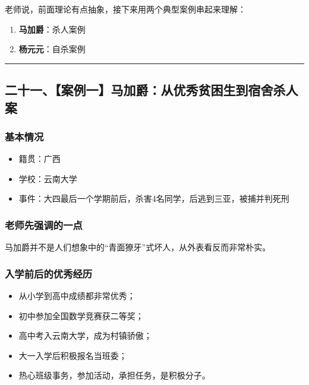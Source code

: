 \documentclass[
  chinese,
  9pt,
  a4paper,
]{ctexart}
\providecommand{\tightlist}{%
  \setlength{\itemsep}{0pt}\setlength{\parskip}{0pt}}
\begin{document}
老师说，前面理论有点抽象，接下来用两个典型案例串起来理解：

\begin{enumerate}
\def\labelenumi{\arabic{enumi}.}
\tightlist
\item
  \textbf{马加爵}：杀人案例
\item
  \textbf{杨元元}：自杀案例
\end{enumerate}

\begin{center}\rule{0.5\linewidth}{0.5pt}\end{center}

\subsection{二十一、【案例一】马加爵：从优秀贫困生到宿舍杀人案}\label{ux4e8cux5341ux4e00ux6848ux4f8bux4e00ux9a6cux52a0ux7235ux4eceux4f18ux79c0ux8d2bux56f0ux751fux5230ux5bbfux820dux6740ux4ebaux6848}

\subsubsection{基本情况}\label{ux57faux672cux60c5ux51b5}

\begin{itemize}
\tightlist
\item
  籍贯：广西
\item
  学校：云南大学
\item
  事件：大四最后一个学期前后，杀害4名同学，后逃到三亚，被捕并判死刑
\end{itemize}

\subsubsection{老师先强调的一点}\label{ux8001ux5e08ux5148ux5f3aux8c03ux7684ux4e00ux70b9}

马加爵并不是人们想象中的``青面獠牙''式坏人，从外表看反而非常朴实。

\subsubsection{入学前后的优秀经历}\label{ux5165ux5b66ux524dux540eux7684ux4f18ux79c0ux7ecfux5386}

\begin{itemize}
\tightlist
\item
  从小学到高中成绩都非常优秀；
\item
  初中参加全国数学竞赛获二等奖；
\item
  高中考入云南大学，成为村镇骄傲；
\item
  大一入学后积极报名当班委；
\item
  热心班级事务，参加活动，承担任务，是积极分子。
\end{itemize}
\end{document}
